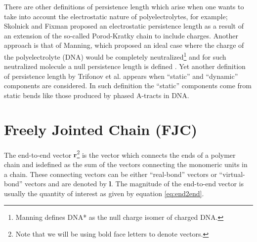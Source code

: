 
There are other definitions of persistence length which arise when one
wants   to   take   into   account   the   electrostatic   nature   of
polyelectrolytes, for example; Skolnick and Fixman \cite{skolnick1977}
proposed  an  electrostatic  persistence  length  as a  result  of  an
extension  of the  so-called  Porod-Kratky chain  to include  charges.
Another  approach is  that of  Manning, which  proposed an  ideal case
where  the charge  of the  polyelectrolyte (DNA)  would  be completely
neutralized\footnote{Manning defines DNA* as the null charge isomer of
  charged DNA.}  and for  such neutralized molecule a null persistence
length  is  defined  \cite{manning2006}.   Yet another  definition  of
persistence length by Trifonov et al. \cite{trifonov1987} appears when
``static''  and  ``dynamic''   components  are  considered.   In  such
definition the ``static'' components come from static bends like those
produced by phased A-tracts in DNA.

\section{Freely Jointed Chain (FJC)}
\label{sec:fjc}
The end-to-end  vector $\mathbf{r}$\footnote{Note  that we will
  be using bold  face letters to denote vectors.}  is the vector which
connects the ends of a polymer chain and isdefined as the sum of
the  vectors  connecting  the  monomeric  units in  a  chain.  These
connecting   vectors   can   be   either  ``real-bond''   vectors   or
``virtual-bond''  vectors  and   are  denoted  by  $\mathbf{l}$.   The
magnitude  of  the  end-to-end  vector  is  usually  the  quantity  of
interest as given by equation \ref{eq:end2end}.

